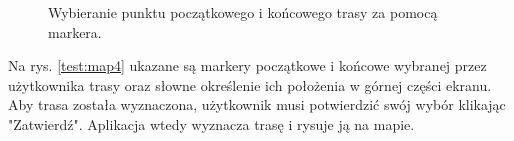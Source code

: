 \setlength{\fboxrule}{0.5pt}
\begin{figure}[H]
    \centering
    \caption{Wybieranie punktu początkowego i końcowego trasy za pomocą markera.}
    \label{test:map3}
\end{figure}
\newpage
Na rys. \ref{test:map4} ukazane są markery początkowe i końcowe wybranej przez użytkownika trasy oraz słowne określenie ich położenia w górnej części ekranu. Aby trasa została wyznaczona, użytkownik musi potwierdzić swój wybór klikając "Zatwierdź". Aplikacja wtedy wyznacza trasę i rysuje ją na mapie.

